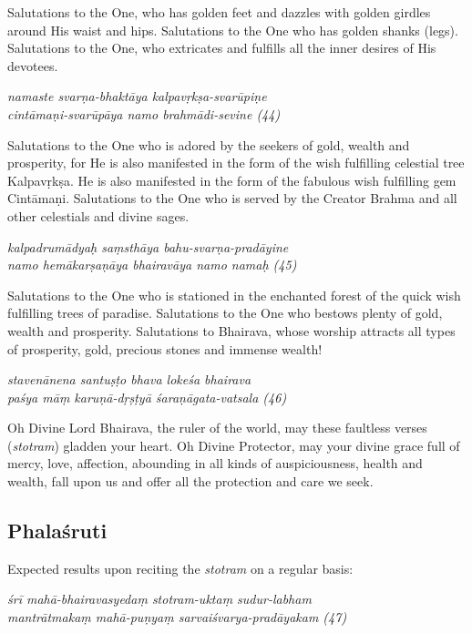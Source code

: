 \documentclass[12pt,oneside,a4paper]{article}
\newenvironment{shloka}[1]
  {\bigskip\center#1\varwidth{\linewidth}}
  {\endvarwidth\endcenter\bigskip}
\newcommand{\tl}[1]{\emph{#1}}
\begin{document}
Salutations to the One, who has golden feet and dazzles with golden girdles
around His waist and hips. Salutations to the One who has golden shanks (legs).
Salutations to the One, who extricates and fulfills all the inner desires of
His devotees.

\begin{shloka}\itshape
  namaste svarṇa-bhaktāya kalpavṛkṣa-svarūpiṇe\\
  cintāmaṇi-svarūpāya namo brahmādi-sevine (44)
\end{shloka}

Salutations to the One who is adored by the seekers of gold, wealth and
prosperity, for He is also manifested in the form of the wish fulfilling
celestial tree Kalpavṛkṣa. He is also manifested in the form of the fabulous
wish fulfilling gem Cintāmaṇi. Salutations to the One who is served by
the Creator Brahma and all other celestials and divine sages.

\begin{shloka}\itshape
  kalpadrumādyaḥ saṃsthāya bahu-svarṇa-pradāyine\\
  namo hemākarṣaṇāya bhairavāya namo namaḥ (45)
\end{shloka}

Salutations to the One who is stationed in the enchanted forest of the quick
wish fulfilling trees of paradise. Salutations to the One who bestows plenty of
gold, wealth and prosperity. Salutations to Bhairava, whose worship attracts all
types of prosperity, gold, precious stones and immense wealth!

\begin{shloka}\itshape
  stavenānena santuṣṭo bhava lokeśa bhairava\\
  paśya māṃ karuṇā-dṛṣṭyā śaraṇāgata-vatsala (46)
\end{shloka}

Oh Divine Lord Bhairava, the ruler of the world, may these faultless verses
(\tl{stotram}) gladden your heart. Oh Divine Protector, may your divine grace
full of mercy, love, affection, abounding in all kinds of auspiciousness, health
and wealth, fall upon us and offer all the protection and care we seek.

\subsection{Phalaśruti}

Expected results upon reciting the \tl{stotram} on a regular basis:

\begin{shloka}\itshape
  śrī mahā-bhairavasyedaṃ stotram-uktaṃ sudur-labham\\
  mantrātmakaṃ mahā-puṇyaṃ sarvaiśvarya-pradāyakam (47)
\end{shloka}
\end{document}
